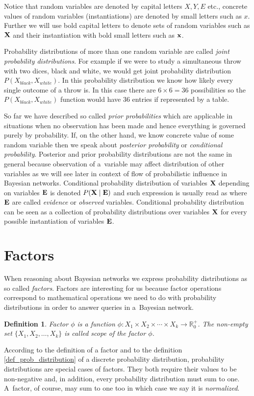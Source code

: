 \documentclass[english,cover]{fitthesis} %
\newtheorem{math_def}{Definition}[chapter] %
\newcommand{\term}[1]{\emph{#1}}           %
\newcommand{\vars}[1]{{\bold{#1}}}         %
\begin{document}
Notice that random variables are denoted by capital letters $X, Y, E$ etc., concrete values of random variables (instantiations) are denoted by small letters such as $x$. Further we will use bold capital letters to denote sets of random variables such as $\vars{X}$ and their instantiation with bold small letters such as $\vars{x}$.

Probability distributions of more than one random variable are called \term{joint probability distributions}. For example if we were to study a simultaneous throw with two dices, black and white, we would get joint probability distribution $P(X_{black},X_{white})$. In this probability distribution we know how likely every single outcome of a throw is. In this case there are $6 \times 6 = 36$ possibilities so the $P(X_{black},X_{white})$ function would have 36 entries if represented by a table.

So far we have described so called \term{prior probabilities} which are applicable in situations when no observation has been made and hence everything is governed purely by probability. If, on the other hand, we know concrete value of some random variable then we speak about \term{posterior probability} or \term{conditional probability}.
Posterior and prior probability distributions are not the same in general because observation of a~variable may affect distribution of other variables as we will see later in context of flow of probabilistic influence in Bayesian networks.
Conditional probability distribution of variables $\vars{X}$ depending on variables $\vars{E}$ is denoted $P(\vars{X}\mid\vars{E})$ and such expression is usually read as \uv{probability of $\vars{X}$ given $\vars{E}$} where $\vars{E}$ are called \term{evidence} or \term{observed} variables. Conditional probability distribution can be seen as a collection of probability distributions over variables $\vars{X}$ for every possible instantiation of variables $\vars{E}$.


\section{Factors}
When reasoning about Bayesian networks we express probability distributions as so called \term{factors}. Factors are interesting for us because factor operations correspond to mathematical operations we need to do with probability distributions in order to answer queries in a~Bayesian network. 
\begin{math_def}\label{def_factor}
    Factor $\phi$ is a function $\phi: X_1 \times X_2 \times \dotsm \times X_k \rightarrow \mathbb{R}_0^+$. The non-empty set $\lbrace X_1, X_2, \dots, X_k \rbrace$ is called scope of the factor $\phi$.
\end{math_def}
According to the definition of a factor and to the definition \ref{def_prob_distribution} of a discrete probability distribution, probability distributions are special cases of factors. They both require their values to be non-negative and, in addition, every probability distribution must sum to one. A~factor, of course, may sum to one too in which case we say it is \term{normalized}.
\end{document}
